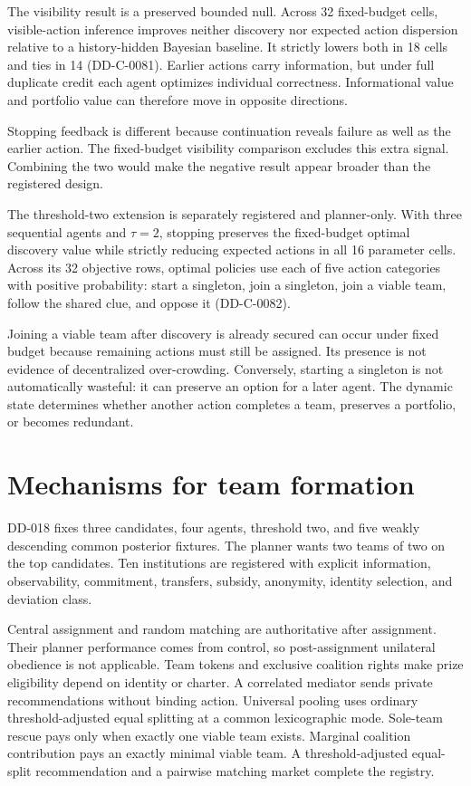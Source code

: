 \documentclass[11pt]{article}
\begin{document}


The visibility result is a preserved bounded null. Across 32 fixed-budget
cells, visible-action inference improves neither discovery nor expected action
dispersion relative to a history-hidden Bayesian baseline. It strictly lowers
both in 18 cells and ties in 14 (DD-C-0081). Earlier actions carry information,
but under full duplicate credit each agent optimizes individual correctness.
Informational value and portfolio value can therefore move in opposite
directions.

Stopping feedback is different because continuation reveals failure as well
as the earlier action. The fixed-budget visibility comparison excludes this
extra signal. Combining the two would make the negative result appear broader
than the registered design.

The threshold-two extension is separately registered and planner-only. With
three sequential agents and $\tau=2$, stopping preserves the fixed-budget
optimal discovery value while strictly reducing expected actions in all 16
parameter cells. Across its 32 objective rows, optimal policies use each of
five action categories with positive probability: start a singleton, join a
singleton, join a viable team, follow the shared clue, and oppose it
(DD-C-0082).

Joining a viable team after discovery is already secured can occur under fixed
budget because remaining actions must still be assigned. Its presence is not
evidence of decentralized over-crowding. Conversely, starting a singleton is
not automatically wasteful: it can preserve an option for a later agent. The
dynamic state determines whether another action completes a team, preserves a
portfolio, or becomes redundant.

\section{Mechanisms for team formation}

DD-018 fixes three candidates, four agents, threshold two, and five weakly
descending common posterior fixtures. The planner wants two teams of two on the
top candidates. Ten institutions are registered with explicit information,
observability, commitment, transfers, subsidy, anonymity, identity selection,
and deviation class.

Central assignment and random matching are authoritative after assignment.
Their planner performance comes from control, so post-assignment unilateral
obedience is not applicable. Team tokens and exclusive coalition rights make
prize eligibility depend on identity or charter. A correlated mediator sends
private recommendations without binding action. Universal pooling uses ordinary
threshold-adjusted equal splitting at a common lexicographic mode. Sole-team
rescue pays only when exactly one viable team exists. Marginal coalition
contribution pays an exactly minimal viable team. A threshold-adjusted
equal-split recommendation and a pairwise matching market complete the
registry.
\end{document}
